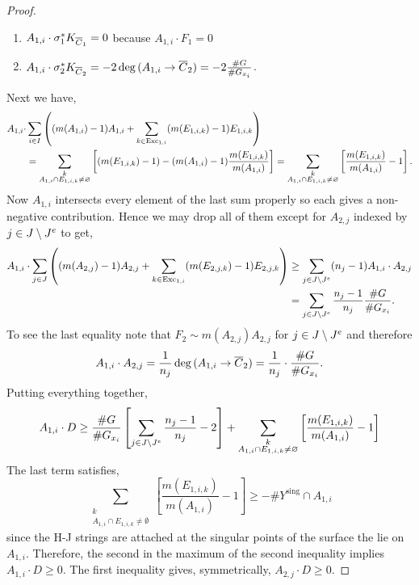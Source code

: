 \documentclass[main.tex]{subfiles}
\begin{document}
\begin{proof}
\begin{enumerate}
\item $A_{1,i} \cdot \sigma_1^* K_{\overline{C}_1} = 0$ because $A_{1,i} \cdot F_1 = 0$
\item $A_{1,i} \cdot \sigma_2^* K_{\overline{C}_2} = -2 \deg{(A_{1,i} \to \overline{C}_2)} = -2 \frac{\# G}{\# G_{x_i}}$.
\end{enumerate}
Next we have,
\begin{align*}
A_{1,i} \cdot & \sum_{i \in I} \left( (m(A_{1,i}) - 1) A_{1,i} + \sum_{k \in \operatorname{\mathrm{Exc}}_{1,i}} (m(E_{1,i,k}) - 1) E_{1,i,k} \right) 
\\
& = \sum_{\substack{k \\ A_{1,i} \cap E_{1,i,k} \neq \varnothing}} \left[  (m(E_{1,i,k}) - 1) - (m(A_{1,i}) - 1) \frac{m(E_{1,i,k})}{m(A_{1,i})} \right] = \sum_{\substack{k \\ A_{1,i} \cap E_{1,i,k} \neq \varnothing}} \left[ \frac{m(E_{1,i,k})}{m(A_{1,i})} - 1 \right].
\end{align*}
Now $A_{1,i}$ intersects every element of the last sum properly so each gives a non-negative contribution. Hence we may drop all of them except for $A_{2,j}$ indexed by $j \in J \setminus J^e$ to get,
\begin{align*}
 A_{1,i} \cdot \sum_{j \in J} \left( (m(A_{2,j}) - 1) A_{2,j} + \sum_{k \in \operatorname{\mathrm{Exc}}_{1,i}} (m(E_{2,j,k}) - 1) E_{2,j,k} \right) & \ge \sum_{j \in J \setminus J^e} (n_j - 1) A_{1,i} \cdot  A_{2,j} 
\\
& = \sum_{j \in J \setminus J^e} \frac{n_j - 1}{n_j} \frac{\# G}{\# G_{x_i}}.
\end{align*}
To see the last equality note that $F_2 \sim m(A_{2,j}) A_{2,j}$ for $j \in J \setminus J^e$ and therefore
\[ A_{1,i} \cdot A_{2,j} = \frac{1}{n_j} \deg{(A_{1,i} \to \overline{C}_2)} = \frac{1}{n_j} \cdot \frac{\# G}{\# G_{x_i}}. \]
Putting everything together,
\[ A_{1,i} \cdot D \ge \frac{\# G}{\# G_{x_i}} \left[ \sum_{j \in J \setminus J^e} \frac{n_j - 1}{n_j} - 2 \right] + \sum_{\substack{k \\ A_{1,i} \cap E_{1,i,k} \neq \varnothing}} \left[ \frac{m(E_{1,i,k})}{m(A_{1,i})} - 1 \right] \]
The last term satisfies, 
\[ \sum_{\substack{k \\ A_{1,i} \cap E_{1,i,k} \neq \emptyset}} \left[ \frac{m(E_{1,i,k})}{m(A_{1,i})} - 1 \right] \ge - \# Y^{\text{sing}} \cap A_{1, i} \]
since the H-J strings are attached at the singular points of the surface the lie on $A_{1,i}$. Therefore, the second in the maximum of the second inequality implies $A_{1,i} \cdot D \ge 0$. The first inequality gives, symmetrically, $A_{2,j} \cdot D \ge 0$. 
\end{proof}
\end{document}
